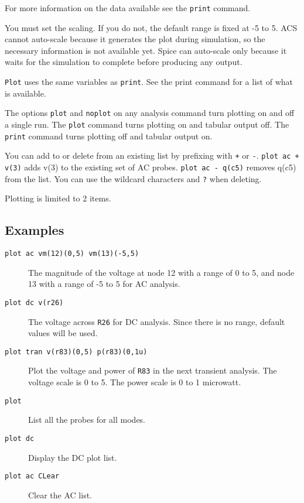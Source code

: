 For more information on the data available see the {\tt print} command.

You must set the scaling.  If you do not, the default range is fixed at -5
to 5.  ACS cannot auto-scale because it generates the plot during simulation,
so the necessary information is not available yet.  Spice can auto-scale only
because it waits for the simulation to complete before producing any output.

{\tt Plot} uses the same variables as {\tt print}.  See the print command 
for a list of what is available.

The options {\tt plot} and {\tt noplot} on any analysis command turn
plotting on and off a single run.  The {\tt plot} command turns 
plotting on and tabular output off.  The {\tt print} command turns plotting 
off and tabular output on.

You can add to or delete from an existing list by prefixing with
{\tt +} or {\tt -}.  {\tt plot ac + v(3)} adds v(3) to the existing
set of AC probes.  {\tt plot ac - q(c5)} removes q(c5) from the
list.  You can use the wildcard characters {\tt *} and {\tt ?} when
deleting.

Plotting is limited to 2 items.
\subsection{Examples}

\begin{description}

\item[{\tt plot ac vm(12)(0,5) vm(13)(-5,5)}] The magnitude of the voltage
at node 12 with a range of 0 to 5, and node 13 with a range of -5 to 5 for
AC analysis.

\item[{\tt plot dc v(r26)}] The voltage across {\tt R26} for DC analysis.
Since there is no range, default values will be used.

\item[{\tt plot tran v(r83)(0,5) p(r83)(0,1u)}] Plot the voltage and power 
of {\tt R83} in the next transient analysis.  The voltage scale is 0 to 5.  
The power scale is 0 to 1 microwatt.

\item[{\tt plot}] List all the probes for all modes.

\item[{\tt plot dc}] Display the DC plot list.

\item[{\tt plot ac CLear}] Clear the AC list.

\end{description}
